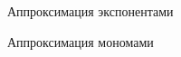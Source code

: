 \documentclass[a4paper]{article}
\begin{document}
\begin{figure}[h!]
  \noindent{}
 \caption{Аппроксимация экспонентами}
  \label{expex}
\end{figure}

\begin{figure}[h!]
    \noindent{}
   \caption{Аппроксимация мономами}
    \label{mon}
\end{figure} 
\end{document}
